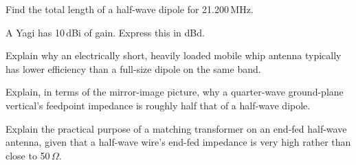 \begin{practiceproblems}
\item Find the total length of a half-wave dipole for 21.200\,MHz.
\item A Yagi has 10\,dBi of gain. Express this in dBd.
\item Explain why an electrically short, heavily loaded mobile whip
antenna typically has lower efficiency than a full-size dipole on the
same band.
\item Explain, in terms of the mirror-image picture, why a quarter-wave
ground-plane vertical's feedpoint impedance is roughly half that of a
half-wave dipole.
\item Explain the practical purpose of a matching transformer on an
end-fed half-wave antenna, given that a half-wave wire's end-fed
impedance is very high rather than close to 50\,$\Omega$.
\end{practiceproblems}
